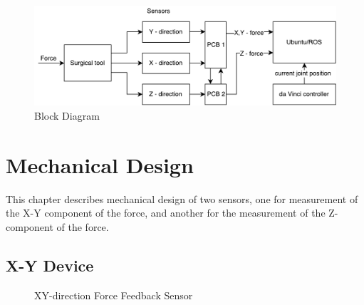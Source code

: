 \begin{figure}[h]
	\begin{center}
		\includegraphics[width=140mm]{fig/methods/dbd2.pdf}
	\end{center}
	\vspace{-4mm}
	\caption[Block Diagram]
	{Block Diagram}
	\label{fig:BlockDiag}
	\vspace{-2mm}
\end{figure}


\section{Mechanical Design}
\label{sec:mechDes}

This chapter describes mechanical design of two sensors, one for measurement of the X-Y component of the force, and another for the measurement of the Z-component of the force. 

\subsection{X-Y Device}
\label{sec:xyDir}

\begin{figure}[h]%
\centering
{}%
\qquad
{}%
\caption{XY-direction Force Feedback Sensor}
\label{fig:XY_device_design}%
\end{figure}

